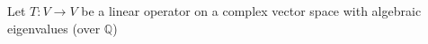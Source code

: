 \documentclass[preview]{standalone}
\begin{document}
\begin{center}
Let $T : V \to V$ be a linear operator on a complex vector space with algebraic eigenvalues (over $\mathbb{Q}$)
\end{center}
\end{document}
